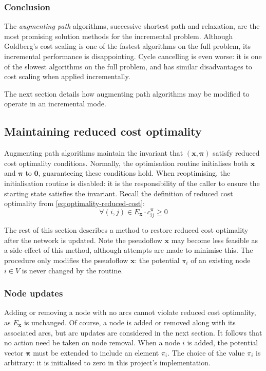 \subsubsection{Conclusion}

The \emph{augmenting path} algorithms, successive shortest path and relaxation, are the most promising solution methods for the incremental problem. Although Goldberg's cost scaling is one of the fastest algorithms on the full problem, its incremental performance is disappointing. Cycle cancelling is even worse: it is one of the slowest algorithms on the full problem, and has similar disadvantages to cost scaling when applied incrementally.

The next section details how augmenting path algorithms may be modified to operate in an incremental mode.

\subsection{Maintaining reduced cost optimality} \label{sec:impl-incremental-maintaining-rc}

Augmenting path algorithms maintain the invariant that $\left(\mathbf{x},\boldsymbol{\pi}\right)$ satisfy reduced cost optimality conditions. Normally, the optimisation routine initialises both $\mathbf{x}$ and $\boldsymbol{\pi}$ to $\mathbf{0}$, guaranteeing these conditions hold. When reoptimising, the initialisation routine is disabled: it is the responsibility of the caller to ensure the starting state satisfies the invariant. Recall the definition of reduced cost optimality from \cref{eq:optimality-reduced-cost}:
\[\forall(i,j)\in E_{\mathbf{x}}\cdot c_{ij}^{\boldsymbol{\pi}}\geq 0\]

The rest of this section describes a method to restore reduced cost optimality after the network is updated. Note the pseudoflow $\mathbf{x}$ may become less feasible as a side-effect of this method, although attempts are made to minimise this. The procedure only modifies the pseudoflow $\mathbf{x}$: the potential $\pi_i$ of an existing node $i \in V$ is never changed by the routine.

\subsubsection{Node updates}

Adding or removing a node with no arcs cannot violate reduced cost optimality, as $E_\mathbf{x}$ is unchanged. Of course, a node is added or removed along with its associated arcs\footnotemark, but arc updates are considered in the next section. It follows that no action need be taken on node removal. When a node $i$ is added, the potential vector $\boldsymbol{\pi}$ must be extended to include an element $\pi_i$. The choice of the value $\pi_i$ is arbitrary: it is initialised to zero in this project's implementation.

